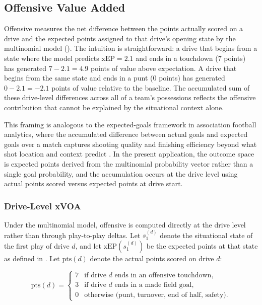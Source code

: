 \subsection{Offensive Value Added}
\label{sec:xvoa}

Offensive \xvoa{} measures the net difference between the points actually
scored on a drive and the expected points assigned to that drive's opening
state by the multinomial \xscore{} model (). The intuition
is straightforward: a drive that begins from a state where the model predicts
$\mathrm{xEP} = 2.1$ and ends in a touchdown (7 points) has generated $7 - 2.1
= 4.9$ points of value above expectation. A drive that begins from the same
state and ends in a punt (0 points) has generated $0 - 2.1 = -2.1$ points of
value relative to the baseline. The accumulated sum of these drive-level
differences across all of a team's possessions reflects the offensive
contribution that cannot be explained by the situational context alone.

This framing is analogous to the expected-goals framework in association
football analytics, where the accumulated difference between actual goals and
expected goals over a match captures shooting quality and finishing efficiency
beyond what shot location and context predict
\parencite{rathke2017expectedgoals}. In the present application, the outcome
space is expected points derived from the multinomial probability vector rather
than a single goal probability, and the accumulation occurs at the drive level
using actual points scored versus expected points at drive start.

\subsubsection{Drive-Level xVOA}

Under the multinomial model, offensive \xvoa{} is computed directly at the
drive level rather than through play-to-play deltas. Let $s_1^{(d)}$ denote
the situational state of the first play of drive $d$, and let
$\mathrm{xEP}(s_1^{(d)})$ be the expected points at that state as defined
in . Let $\mathrm{pts}(d)$ denote the actual points scored on
drive $d$:

\begin{equation}
  \label{eq:pts-drive}
  \mathrm{pts}(d) =
    \begin{cases}
      7 & \text{if drive } d \text{ ends in an offensive touchdown}, \\
      3 & \text{if drive } d \text{ ends in a made field goal}, \\
      0 & \text{otherwise (punt, turnover, end of half, safety).}
    \end{cases}
\end{equation}


